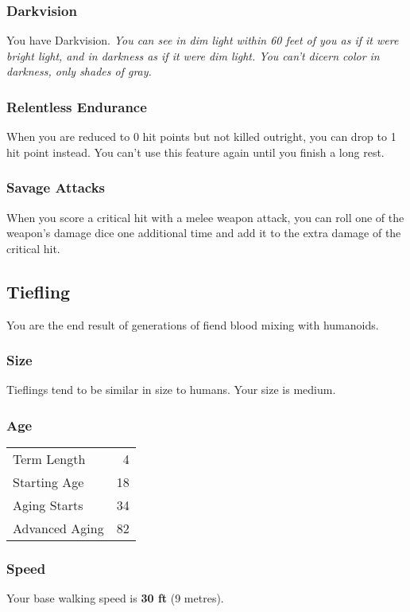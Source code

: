 \documentclass[10pt,twoside]{article}
\begin{document}
\begin{multicols}{2}
\subsubsection*{Darkvision}
You have Darkvision.
\textit{You can see in dim light within 60 feet of you as if it were bright light, and in darkness as if it were dim light. You can’t dicern color in darkness, only shades of gray.}

\subsubsection*{Relentless Endurance}
When you are reduced to 0 hit points but not killed outright, you can drop to 1 hit point instead. You can't use this feature again until you finish a long rest.

\subsubsection*{Savage Attacks}
When you score a critical hit with a melee weapon attack, you can roll one of the weapon's damage dice one additional time and add it to the extra damage of the critical hit.


\subsection{Tiefling}

You are the end result of generations of fiend blood mixing with humanoids.

\subsubsection*{Size}
Tieflings tend to be similar in size to humans. Your size is medium.

\subsubsection*{Age}
\begin{tabular}{ l r }
  Term Length & 4 \\
  Starting Age & 18 \\
  Aging Starts & 34 \\
  Advanced Aging & 82 \\
\end{tabular}

\subsubsection*{Speed}
Your base walking speed is \textbf{30 ft} (9 metres).


\end{multicols}
\end{document}
